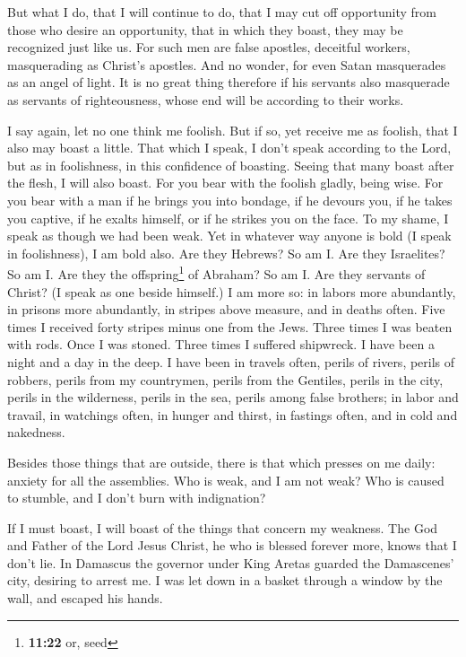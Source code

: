  But what I do, that I will continue to do, that I may
cut off opportunity from those who desire an opportunity, that in which
they boast, they may be recognized just like us.  For
such men are false apostles, deceitful workers, masquerading as Christ's
apostles.  And no wonder, for even Satan masquerades as
an angel of light.  It is no great thing therefore if his
servants also masquerade as servants of righteousness, whose end will be
according to their works.

 I say again, let no one think me foolish. But if so, yet
receive me as foolish, that I also may boast a little. 
That which I speak, I don't speak according to the Lord, but as in
foolishness, in this confidence of boasting.  Seeing that
many boast after the flesh, I will also boast.  For you
bear with the foolish gladly, being wise.  For you bear
with a man if he brings you into bondage, if he devours you, if he takes
you captive, if he exalts himself, or if he strikes you on the face.
 To my shame, I speak as though we had been weak. Yet in
whatever way anyone is bold (I speak in foolishness), I am bold also.
 Are they Hebrews? So am I. Are they Israelites? So am I.
Are they the offspring\footnote{\textbf{11:22} or, seed} of Abraham? So
am I.  Are they servants of Christ? (I speak as one
beside himself.) I am more so: in labors more abundantly, in prisons
more abundantly, in stripes above measure, and in deaths often.
 Five times I received forty stripes minus one from the
Jews.  Three times I was beaten with rods. Once I was
stoned. Three times I suffered shipwreck. I have been a night and a day
in the deep.  I have been in travels often, perils of
rivers, perils of robbers, perils from my countrymen, perils from the
Gentiles, perils in the city, perils in the wilderness, perils in the
sea, perils among false brothers;  in labor and travail,
in watchings often, in hunger and thirst, in fastings often, and in cold
and nakedness.

 Besides those things that are outside, there is that
which presses on me daily: anxiety for all the assemblies.
 Who is weak, and I am not weak? Who is caused to
stumble, and I don't burn with indignation?

 If I must boast, I will boast of the things that concern
my weakness.  The God and Father of the Lord Jesus
Christ, he who is blessed forever more, knows that I don't lie.
 In Damascus the governor under King Aretas guarded the
Damascenes' city, desiring to arrest me.  I was let down
in a basket through a window by the wall, and escaped his hands.


